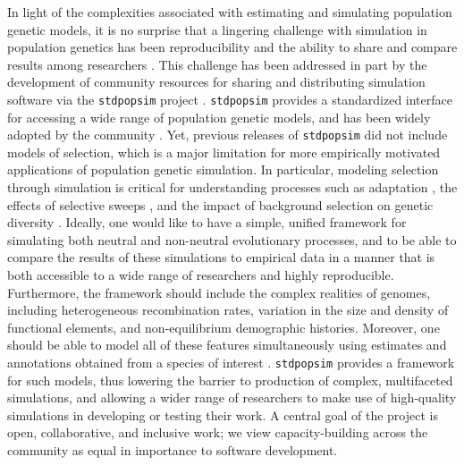\documentclass[hidelinks]{article}
\newcommand{\stdpopsim}{\texttt{stdpopsim}\xspace}
\begin{document}
    In light of the complexities associated with estimating and simulating
    population genetic models, it is no surprise that
    a lingering challenge with simulation in population genetics has been
    reproducibility and the ability to share and compare results among
    researchers \citep[e.g.,][]{ragsdale2020lessons}.
    This challenge has been addressed in part by the development
    of community resources for sharing and distributing simulation software
    via the \stdpopsim project \citep{adrion2020community}. \stdpopsim
    provides a standardized interface for accessing a wide range of
    population genetic models, and has been widely adopted by the community
    \citep[e.g.,][]{speidel2021inferring, wang2021automatic, yang2022trustgwas, degiorgio2022spatially, browning2023fast, schweiger2023ultrafast, temple2024modeling, haag2025pandora}.
    Yet, previous releases of \stdpopsim did not include
    models of selection, which is a major limitation for more empirically motivated
    applications of population genetic simulation. In particular, modeling selection
    through simulation is critical for understanding processes such
    as adaptation \citep[e.g.][]{thornton2019polygenic,hartfield2024polygenic}, the effects of selective sweeps
    \citep[e.g.][]{braverman1995hitchhiking,fay2000hitchhiking,przeworski2002signature,przeworski2005signature,schrider2015soft},
    and the impact of background selection on genetic diversity
    \citep[e.g.][]{charlesworth1993effect,charlesworth1995pattern,williamson2002genealogy,ewing2016consequences,torres2020temporal}.
    Ideally, one would like
    to have a simple, unified framework for simulating both neutral and
    non-neutral evolutionary processes, and to be able to compare the
    results of these simulations to empirical data in a manner that is
    both accessible to a wide range of researchers and highly reproducible.
    Furthermore, the framework should include the complex realities of
    genomes, including heterogeneous recombination rates,
    variation in the size and density of functional elements, and
    non-equilibrium demographic histories. Moreover, one should be able
    to model all of these features simultaneously using estimates and annotations obtained
    from a species of interest \citep[e.g.][]{schrider2020background,rodrigues2024shared}.
    \stdpopsim{} provides a framework for such models,
    thus lowering the barrier to production of complex, multifaceted simulations,
    and allowing a wider range of researchers to make use of high-quality simulations
    in developing or testing their work.
    A central goal of the project is open, collaborative, and inclusive work;
    we view capacity-building across the community as equal in importance to software development.
\end{document}
